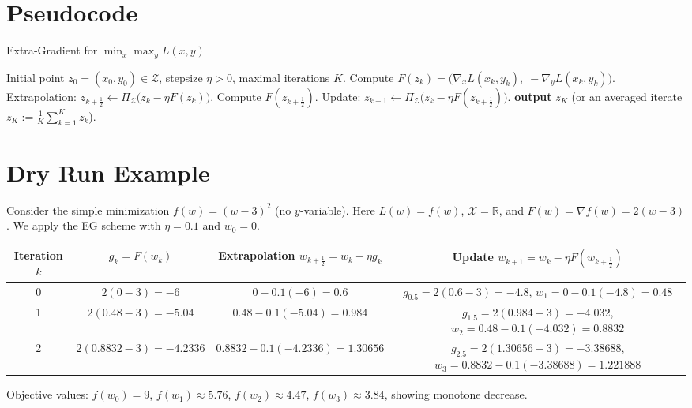 \documentclass{article}
\newcommand{\R}{\mathbb{R}}
\begin{document}
\section*{Pseudocode}
\begin{algorithm}[H]
\caption{Extra‑Gradient for $\min_{x}\max_{y}L(x,y)$}
\begin{algorithmic}[1]
\Require Initial point $z_{0}=(x_{0},y_{0})\in\mathcal Z$, stepsize $\eta>0$, maximal iterations $K$.
    \State Compute $F(z_{k})=\bigl(\nabla_{x}L(x_{k},y_{k}),\;-\nabla_{y}L(x_{k},y_{k})\bigr)$.
    \State Extrapolation: $z_{k+\frac12}\gets\Pi_{\mathcal Z}\bigl(z_{k}-\eta F(z_{k})\bigr)$.
    \State Compute $F(z_{k+\frac12})$.
    \State Update: $z_{k+1}\gets\Pi_{\mathcal Z}\bigl(z_{k}-\eta F(z_{k+\frac12})\bigr)$.
\EndFor
\State \textbf{output} $z_{K}$ (or an averaged iterate $\bar z_{K}:=\tfrac1K\sum_{k=1}^{K}z_{k}$).
\end{algorithmic}
\end{algorithm}

\section*{Dry Run Example}
Consider the simple minimization $f(w)=(w-3)^{2}$ (no $y$‑variable).  
Here $L(w)=f(w)$, $\mathcal X=\R$, and $F(w)=\nabla f(w)=2(w-3)$.  
We apply the EG scheme with $\eta=0.1$ and $w_{0}=0$.

\begin{center}
\begin{tabular}{c|c|c|c}
Iteration $k$ & $g_{k}=F(w_{k})$ & Extrapolation $w_{k+\frac12}=w_{k}-\eta g_{k}$ & Update $w_{k+1}=w_{k}-\eta F(w_{k+\frac12})$\\\hline
0 & $2(0-3)=-6$ & $0-0.1(-6)=0.6$ & $g_{0.5}=2(0.6-3)=-4.8$, $w_{1}=0-0.1(-4.8)=0.48$\\
1 & $2(0.48-3)=-5.04$ & $0.48-0.1(-5.04)=0.984$ & $g_{1.5}=2(0.984-3)=-4.032$, $w_{2}=0.48-0.1(-4.032)=0.8832$\\
2 & $2(0.8832-3)=-4.2336$ & $0.8832-0.1(-4.2336)=1.30656$ & $g_{2.5}=2(1.30656-3)=-3.38688$, $w_{3}=0.8832-0.1(-3.38688)=1.221888$\\
\end{tabular}
\end{center}
Objective values: $f(w_{0})=9$, $f(w_{1})\approx5.76$, $f(w_{2})\approx4.47$, $f(w_{3})\approx3.84$, showing monotone decrease.
\end{document}
